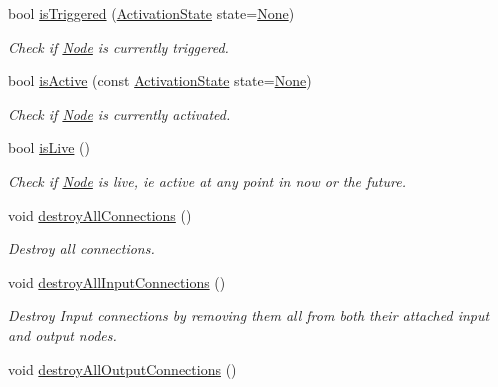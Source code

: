 \begin{DoxyCompactItemize}
bool \hyperlink{classcryomesh_1_1components_1_1Node_a83303fef90a3093807d76a59e4df5288}{is\-Triggered} (\hyperlink{classcryomesh_1_1components_1_1Node_a291becdd589b5bd338d5c0dd28199798}{\-Activation\-State} state=\hyperlink{classcryomesh_1_1components_1_1Node_a291becdd589b5bd338d5c0dd28199798a4b7d78598441d7b9fd51e7bb58415f4b}{\-None})
\begin{DoxyCompactList}\small\item\em \-Check if \hyperlink{classcryomesh_1_1components_1_1Node}{\-Node} is currently triggered. \end{DoxyCompactList}\item 
bool \hyperlink{classcryomesh_1_1components_1_1Node_af2943ca887ce9c2b1a65297cae14d752}{is\-Active} (const \hyperlink{classcryomesh_1_1components_1_1Node_a291becdd589b5bd338d5c0dd28199798}{\-Activation\-State} state=\hyperlink{classcryomesh_1_1components_1_1Node_a291becdd589b5bd338d5c0dd28199798a4b7d78598441d7b9fd51e7bb58415f4b}{\-None})
\begin{DoxyCompactList}\small\item\em \-Check if \hyperlink{classcryomesh_1_1components_1_1Node}{\-Node} is currently activated. \end{DoxyCompactList}\item 
bool \hyperlink{classcryomesh_1_1components_1_1Node_a2309ba6b3ffa640410dfdc1630a66400}{is\-Live} ()
\begin{DoxyCompactList}\small\item\em \-Check if \hyperlink{classcryomesh_1_1components_1_1Node}{\-Node} is live, ie active at any point in now or the future. \end{DoxyCompactList}\item 
void \hyperlink{classcryomesh_1_1components_1_1Node_ade4a1e563ab60b7d8ff8fa6830d2fcbf}{destroy\-All\-Connections} ()
\begin{DoxyCompactList}\small\item\em \-Destroy all connections. \end{DoxyCompactList}\item 
void \hyperlink{classcryomesh_1_1components_1_1Node_ad61b50a382ae7d64cedb8f8f8a5d66cd}{destroy\-All\-Input\-Connections} ()
\begin{DoxyCompactList}\small\item\em \-Destroy \-Input connections by removing them all from both their attached input and output nodes. \end{DoxyCompactList}\item 
void \hyperlink{classcryomesh_1_1components_1_1Node_a8147d9a370a680ffb6c847a0df276114}{destroy\-All\-Output\-Connections} ()

\end{DoxyCompactItemize}
